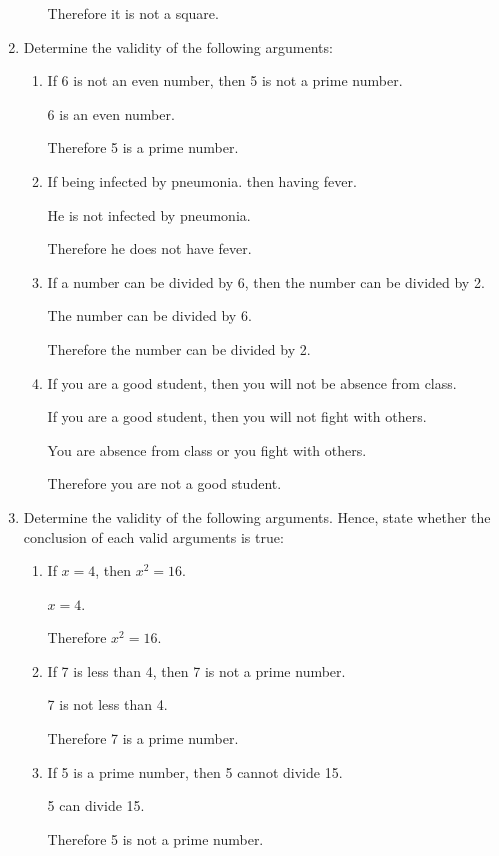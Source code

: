 \documentclass{report}
\begin{document}
\begin{enumerate}
\begin{enumerate}
                    Therefore it is not a square.
          \end{enumerate}

    \item Determine the validity of the following arguments:
          \begin{enumerate}
              \item If 6 is not an even number, then 5 is not a prime number.

                    6 is an even number.

                    Therefore 5 is a prime number.

              \item If being infected by pneumonia. then having fever.

                    He is not infected by pneumonia.

                    Therefore he does not have fever.

              \item If a number can be divided by 6, then the number can be divided by 2.

                    The number can be divided by 6.

                    Therefore the number can be divided by 2.

              \item If you are a good student, then you will not be absence from class.

                    If you are a good student, then you will not fight with others.

                    You are absence from class or you fight with others.

                    Therefore you are not a good student.
          \end{enumerate}

    \item Determine the validity of the following arguments. Hence, state whether the
          conclusion of each valid arguments is true:
          \begin{enumerate}
              \item If $x = 4$, then $x^2 = 16$.

                    $x = 4$.

                    Therefore $x^2 = 16$.

              \item If 7 is less than 4, then 7 is not a prime number.

                    7 is not less than 4.

                    Therefore 7 is a prime number.

              \item If 5 is a prime number, then 5 cannot divide 15.

                    5 can divide 15.

                    Therefore 5 is not a prime number.
          \end{enumerate}
\end{enumerate}
\end{document}
